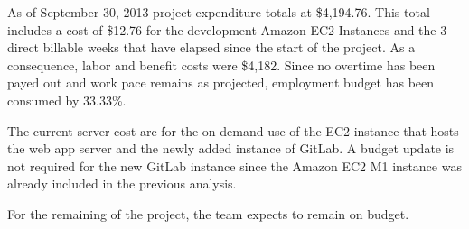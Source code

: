 



As of September 30, 2013 project expenditure totals at \$4,194.76. This total
includes a cost of \$12.76 for the development Amazon EC2 Instances and the 3
direct billable weeks that have elapsed since the start of the project. As a
consequence, labor and benefit costs were \$4,182. Since no overtime has been
payed out and work pace remains as projected, employment budget has been
consumed by 33.33\%.

The current server cost are for the on-demand use of the EC2 instance that hosts
the web app server and the newly added instance of GitLab. A budget update is
not required for the new GitLab instance since the Amazon EC2 M1 instance was
already included in the previous analysis.

For the remaining of the project, the team expects to remain on budget.
